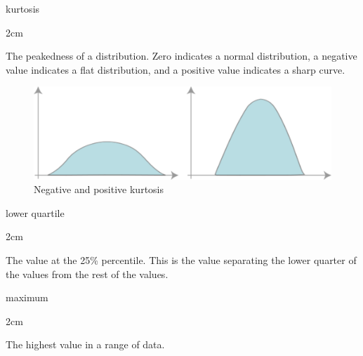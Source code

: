 \documentclass[
]{book}
\newenvironment{glsentry}
  {
  \begin{minipage}{\textwidth}
  }
  {
  \end{minipage}
  }
\newenvironment{glsterm}
  {
  \bfseries
  }
  {
  }
\newenvironment{glsdef}
  {
  \noindent
  \flushleft
  \begin{adjustwidth}{2cm}{}
  }
  {
  \end{adjustwidth}
  }
\theoremstyle{definition}
\theoremstyle{definition}
\theoremstyle{definition}
\theoremstyle{definition}
\theoremstyle{remark}
\begin{document}
\begin{glsentry}

\begin{glsterm}
kurtosis

\end{glsterm}

\begin{glsdef}

The peakedness of a distribution. Zero indicates a normal distribution, a negative value indicates a flat distribution, and a positive value indicates a sharp curve.

\begin{figure}[H]

{\centering \includegraphics[width=6.94in,]{Images/NonGenerated/Kurtosis} 

}

\caption{Negative and positive kurtosis}\label{fig:unnamed-chunk-129}
\end{figure}

\end{glsdef}

\end{glsentry}

\begin{glsentry}

\begin{glsterm}
lower quartile

\end{glsterm}

\begin{glsdef}
The value at the 25\% percentile. This is the value separating the lower quarter of the values from the rest of the values.

\end{glsdef}

\end{glsentry}

\begin{glsentry}

\begin{glsterm}
maximum

\end{glsterm}

\begin{glsdef}
The highest value in a range of data.

\end{glsdef}

\end{glsentry}
\end{document}

